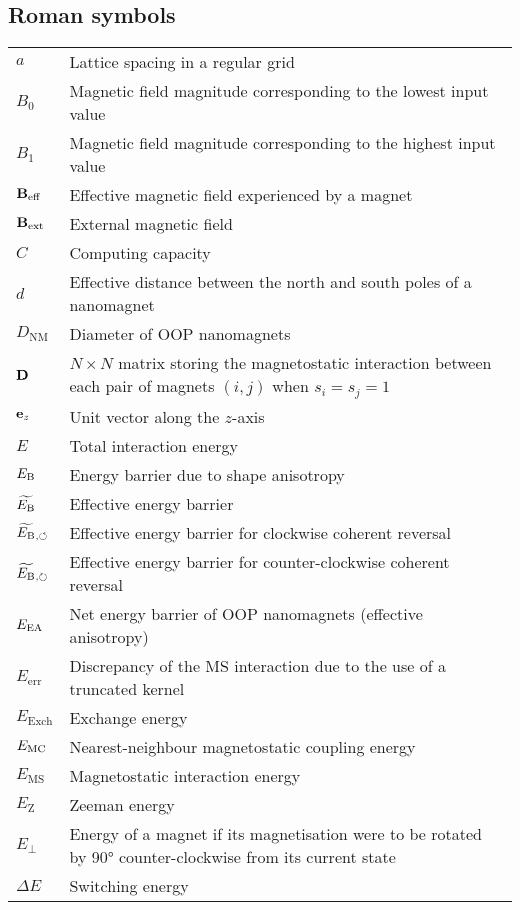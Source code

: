 \subsection*{Roman symbols}
\begin{longtable}[l]{p{60pt} p{350pt}}
	$a$ & Lattice spacing in a regular grid\vspace{\whiteline}\\

	$B_0$ & Magnetic field magnitude corresponding to the lowest input value \\
	$B_1$ & Magnetic field magnitude corresponding to the highest input value \\
	$\boldsymbol{\mathbf{B}}_\mathrm{eff}$ & Effective magnetic field experienced by a magnet \\
	$\boldsymbol{\mathbf{B}}_\mathrm{ext}$ & External magnetic field\vspace{\whiteline}\\
	
	$C$ & Computing capacity\vspace{\whiteline}\\

	$d$ & Effective distance between the north and south poles of a nanomagnet \\
	$D_\mathrm{NM}$ & Diameter of OOP nanomagnets \\
	$\boldsymbol{\mathbf{D}}$ & $N \times N$ matrix storing the magnetostatic interaction between each pair of magnets $(i,j)$ when $s_i=s_j=1$\vspace{\whiteline}\\

	$\boldsymbol{\mathbf{e}}_z$ & Unit vector along the $z$-axis \\
	$E$ & Total interaction energy \\
	$E_\mathrm{B}$ & Energy barrier due to shape anisotropy \\
	$\widetilde{E_\mathrm{B}}$ & Effective energy barrier \\
	$\widetilde{E_\mathrm{B}}{}_{,\circlearrowleft}$ & Effective energy barrier for clockwise coherent reversal \\
	$\widetilde{E_\mathrm{B}}{}_{,\circlearrowright}$ & Effective energy barrier for counter-clockwise coherent reversal \\
	$E_\mathrm{EA}$ & Net energy barrier of OOP nanomagnets (effective anisotropy) \\
	$E_\mathrm{err}$ & Discrepancy of the MS interaction due to the use of a truncated kernel \\
	$E_\mathrm{Exch}$ & Exchange energy\\
	$E_\mathrm{MC}$ & Nearest-neighbour magnetostatic coupling energy \\
	$E_\mathrm{MS}$ & Magnetostatic interaction energy \\
	$E_\mathrm{Z}$ & Zeeman energy\\
	$E_\perp$ & Energy of a magnet if its magnetisation were to be rotated by \ang{90} counter-clockwise from its current state \\
	$\Delta E$ & Switching energy\vspace{\whiteline}\\
	

\end{longtable}

